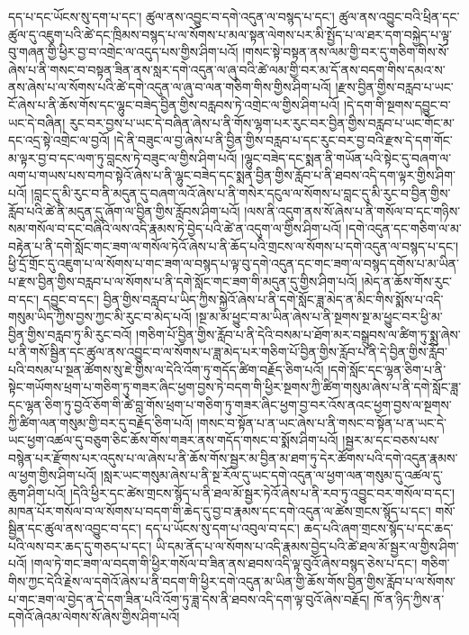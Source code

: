 དད་པ་དང་ཡོངས་སུ་དག་པ་དང་། ཚུལ་ནས་འབྱུང་བ་དགེ་འདུན་ལ་བསྙད་པ་དང་། ཚུལ་ནས་འབྱུང་བའི་ཕྲིན་དང་ཚུལ་དུ་འཇུག་པའི་ཚེ་དང་ཁྲིམས་བསྙད་པ་ལ་སོགས་པ་མལ་སྟན་ལེགས་པར་མི་སྤྱོད་པ་ལ་ཐར་དག་བསྐྱེད་པ་ལྟ་བུ་གཞན་གྱི་ཕྱིར་བྱ་བ་འགྲེང་ལ་འདུད་པས་གྱིས་ཤིག་པའོ། །གསང་སྟེ་བསྟན་ནས་ལམ་གྱི་བར་དུ་གཅིག་གིས་སོ་ཞེས་པ་ནི་གསང་བ་བསྟན་ཟིན་ནས་སླར་དགེ་འདུན་ལ་ཞུ་བའི་ཚེ་ལམ་གྱི་བར་མ་དོ་ནས་བདག་གིས་དམའ་ས་ནས་ཞེས་པ་ལ་སོགས་པའི་ཚེ་དགེ་འདུན་ལ་ཞུ་བ་ལན་གཅིག་གིས་གྱིས་ཤིག་པའོ། །རྫས་བྱིན་གྱིས་བརླབ་པ་ཡང་ངོ་ཞེས་པ་ནི་ཆོས་གོས་དང་ལྷུང་བཟེད་བྱིན་གྱིས་བརླབས་ཏེ་འགྲེང་ལ་གྱིས་ཤིག་པའོ། །དེ་དག་གི་སྔགས་དབྱུང་བ་ཡང་དེ་བཞིན། རུང་བར་བྱས་པ་ཡང་དེ་བཞིན་ཞེས་པ་ནི་གོས་ལྷག་པར་རུང་བར་བྱིན་གྱིས་བརླབ་པ་ཡང་གོང་མ་དང་འདྲ་སྟེ་འགྲེང་ལ་བྱའོ། །དེ་ནི་བཟུང་ལ་བྱ་ཞེས་པ་ནི་བྱིན་གྱིས་བརླབ་པ་དང་རུང་བར་བྱ་བའི་རྫས་དེ་དག་གོང་མ་ལྟར་བྱ་བ་དང་ལག་ཏུ་བླངས་ཏེ་བཟུང་ལ་གྱིས་ཤིག་པའོ། །ལྷུང་བཟེད་དང་སྨན་ནི་གཡོན་པའི་སྟེང་དུ་བཞག་ལ་ལག་པ་གཡས་པས་བཀབ་སྟེའོ་ཞེས་པ་ནི་ལྷུང་བཟེད་དང་སྨན་བྱིན་གྱིས་རློབ་པ་ནི་ཐབས་འདི་དག་ལྟར་གྱིས་ཤིག་པའོ། །བླང་དུ་མི་རུང་བ་ནི་མདུན་དུ་བཞག་ལའོ་ཞེས་པ་ནི་གསེར་དངུལ་ལ་སོགས་པ་བླང་དུ་མི་རུང་བ་བྱིན་གྱིས་རློབ་པའི་ཚེ་ནི་མདུན་དུ་ཞོག་ལ་བྱིན་གྱིས་རློབས་ཤིག་པའོ། །ལས་ནི་འདུག་ནས་སོ་ཞེས་པ་ནི་གསོལ་བ་དང་གཉིས་སམ་གསོལ་བ་དང་བཞིའི་ལས་འདི་རྣམས་ཏེ་བྱེད་པའི་ཚེ་ན་འདུག་ལ་གྱིས་ཤིག་པའོ། །དགེ་འདུན་དང་གཅིག་ལ་མ་བརྟེན་པ་ནི་དགེ་སློང་གང་ཟག་ལ་གསོལ་ཏེའོ་ཞེས་པ་ནི་ཆོད་པའི་གྲངས་ལ་སོགས་པ་དགེ་འདུན་ལ་བསྙད་པ་དང་། ཕྱི་དྲོ་གྲོང་དུ་འཇུག་པ་ལ་སོགས་པ་གང་ཟག་ལ་བསྙད་པ་ལྟ་བུ་དགེ་འདུན་དང་གང་ཟག་ལ་བསྙད་དགོས་པ་མ་ཡིན་པ་རྫས་བྱིན་གྱིས་བརླབ་པ་ལ་སོགས་པ་ནི་དགེ་སློང་གང་ཟག་གི་མདུན་དུ་གྱིས་ཤིག་པའོ། །མེད་ན་ཆོས་གོས་རུང་བ་དང་། དབྱུང་བ་དང་། བྱིན་གྱིས་བརླབ་པ་ཡིད་ཀྱིས་སྐྱེའོ་ཞེས་པ་ནི་དགེ་སློང་ཟླ་མེད་ན་མིང་གིས་སྨོས་པ་འདི་གསུམ་ཡིད་ཀྱིས་བྱས་ཀྱང་མི་རུང་བ་མེད་པའོ། །སྔ་མ་མ་ཕྱུང་བ་མ་ཡིན་ཞེས་པ་ནི་སྔགས་སྔ་མ་ཕྱུང་བར་ཕྱི་མ་བྱིན་གྱིས་བརླབ་ཏུ་མི་རུང་བའོ། །གཅིག་པོ་བྱིན་གྱིས་རློབ་པ་ནི་དེའི་བསམ་པ་ཐོག་མར་བསྒྲུབས་ལ་ཚིག་ཏུ་སྨྲ་ཞེས་པ་ནི་གསོ་སྦྱིན་དང་ཚུལ་ནས་འབྱུང་བ་ལ་སོགས་པ་ཟླ་མེད་པར་གཅིག་པོ་བྱིན་གྱིས་རློབ་པ་ནི་དེ་བྱིན་གྱིས་རློབ་པའི་བསམ་པ་སྔན་ཚོགས་སུ་ཇེ་གྱིས་ལ་དེའི་འོག་ཏུ་གདོད་ཚིག་བརྗོད་ཅིག་པའོ། །དགེ་སློང་དང་ལྷན་ཅིག་པ་ནི་སྟེང་གཡོགས་ཕྲག་པ་གཅིག་ཏུ་གཟར་ཞིང་ཕྱག་བྱས་ཏེ་བདག་གི་ཕྱིར་སྔགས་ཀྱི་ཚིག་གསུམ་ཞེས་པ་ནི་དགེ་སློང་ཟླ་དང་ལྷན་ཅིག་ཏུ་བྱའོ་ཅོག་གི་ཚེ་བླ་གོས་ཕྲག་པ་གཅིག་ཏུ་གཟར་ཞིང་ཕྱག་བྱ་བར་འོས་ནའང་ཕྱག་བྱས་ལ་སྔགས་ཀྱི་ཚིག་ལན་གསུམ་གྱི་བར་དུ་བརྗོད་ཅིག་པའོ། །གསང་བ་སྟོན་པ་ན་ཡང་ཞེས་པ་ནི་གསང་བ་སྟོན་པ་ན་ཡང་དེ་ཡང་ཕྱག་འཚལ་དུ་བཅུག་ཅིང་ཆོས་གོས་གཟར་ནས་གདོད་གསང་བ་སྨོས་ཤིག་པའོ། །སྦྱར་མ་དང་བཅས་པས་བསྙེན་པར་རྫོགས་པར་འདུས་པ་ལ་ཞེས་པ་ནི་ཆོས་གོས་སྦྱར་མ་བྱིན་མ་ཐག་ཏུ་དེར་ཚོགས་པའི་དགེ་འདུན་རྣམས་ལ་ཕྱག་གྱིས་ཤིག་པའོ། །སླར་ཡང་གསུམ་ཞེས་པ་ནི་སྔ་རོལ་དུ་ཡང་དགེ་འདུན་ལ་ཕྱག་ལན་གསུམ་དུ་འཚལ་དུ་ཆུག་ཤིག་པའོ། །དེའི་ཕྱིར་དང་ཚེས་གྲངས་སྙོད་པ་ནི་ཐལ་མོ་སྦྱར་ཏེའོ་ཞེས་པ་ནི་རབ་ཏུ་འབྱུང་བར་གསོལ་བ་དང་། མཁན་པོར་གསོལ་བ་ལ་སོགས་པ་བདག་གི་ཆེད་དུ་བྱ་བ་རྣམས་དང་དགེ་འདུན་ལ་ཚེས་གྲངས་སྙོད་པ་དང་། གསོ་སྦྱིན་དང་ཚུལ་ནས་འབྱུང་བ་དང་། དད་པ་ཡོངས་སུ་དག་པ་འབུལ་བ་དང་། ཆད་པའི་ཞག་གྲངས་སྙོད་པ་དང་ཆད་པའི་ལས་བར་ཆད་དུ་གཅད་པ་དང་། ཡི་དམ་ནོད་པ་ལ་སོགས་པ་འདི་རྣམས་བྱེད་པའི་ཚེ་ཐལ་མོ་སྦྱར་ལ་གྱིས་ཤིག་པའོ། །གལ་ཏེ་གང་ཟག་ལ་བདག་གི་ཕྱིར་གསོལ་བ་ཟིན་ནས་ཐབས་འདི་ལྟ་བུའོ་ཞེས་བསྙད་ཅེས་པ་དང་། གཅིག་གིས་ཀྱང་དེའི་རྗེས་ལ་དགེའོ་ཞེས་པ་ནི་བདག་གི་ཕྱིར་དགེ་འདུན་མ་ཡིན་གྱི་ཆོས་གོས་བྱིན་གྱིས་རློབ་པ་ལ་སོགས་པ་གང་ཟག་ལ་བྱེད་ན་དེ་དག་ཟིན་པའི་འོག་ཏུ་ཟླ་དེས་ནི་ཐབས་འདི་དག་ལྟ་བུའོ་ཞེས་བརྗོད། ཁོ་ན་ཉིད་ཀྱིས་ན་དགེའོ་ཞེའམ་ལེགས་སོ་ཞེས་གྱིས་ཤིག་པའོ། 